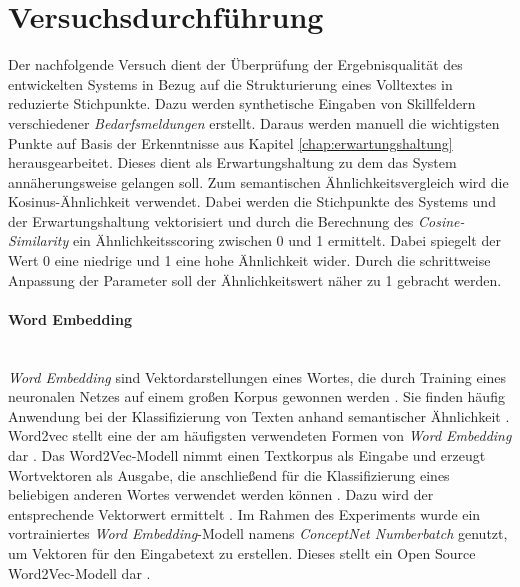 \section{Versuchsdurchführung}
Der nachfolgende Versuch dient der Überprüfung der Ergebnisqualität des entwickelten Systems in Bezug auf die Strukturierung eines Volltextes in reduzierte Stichpunkte. Dazu werden synthetische Eingaben von Skillfeldern verschiedener \emph{Bedarfsmeldungen} erstellt. Daraus werden manuell die wichtigsten Punkte auf Basis der Erkenntnisse aus Kapitel \ref{chap:erwartungshaltung} herausgearbeitet. Dieses dient als Erwartungshaltung zu dem das System annäherungsweise gelangen soll. Zum semantischen Ähnlichkeitsvergleich wird die Kosinus-Ähnlichkeit verwendet. Dabei werden die Stichpunkte des Systems und der Erwartungshaltung vektorisiert und durch die Berechnung des \emph{Cosine-Similarity} ein Ähnlichkeitsscoring zwischen 0 und 1 ermittelt. Dabei spiegelt der Wert 0 eine niedrige und 1 eine hohe Ähnlichkeit wider. Durch die schrittweise Anpassung der Parameter soll der Ähnlichkeitswert näher zu 1 gebracht werden.
\paragraph{Word Embedding}\mbox{}\\
\emph{Word Embedding} sind Vektordarstellungen eines Wortes, die durch Training eines neuronalen Netzes auf einem großen Korpus gewonnen werden \cite{sitikhu2019comparison}. Sie finden häufig Anwendung bei der Klassifizierung von Texten anhand semantischer Ähnlichkeit \cite{sitikhu2019comparison}. Word2vec stellt eine der am häufigsten verwendeten Formen von \emph{Word Embedding} dar \cite{sitikhu2019comparison}. Das Word2Vec-Modell nimmt einen Textkorpus als Eingabe und erzeugt Wortvektoren als Ausgabe, die anschließend für die Klassifizierung eines beliebigen anderen Wortes verwendet werden können \cite{sitikhu2019comparison}. Dazu wird der entsprechende Vektorwert ermittelt \cite{sitikhu2019comparison}. Im Rahmen des Experiments wurde ein vortrainiertes \emph{Word Embedding}-Modell namens \emph{ConceptNet Numberbatch} \cite{speer2017conceptnet} genutzt, um Vektoren für den Eingabetext zu erstellen. Dieses stellt ein Open Source Word2Vec-Modell dar \cite{sitikhu2019comparison}.
